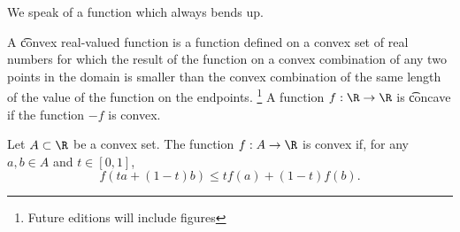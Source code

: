 

We speak of a function which always bends up.


A \t{convex} real-valued function is a function defined on a convex set of real numbers for which the result of the function on a convex combination of any two points in the domain is smaller than the convex combination of the same length of the value of the function on the endpoints.
  \ifhmode\unskip\fi\footnote{
Future editions will include figures
  }
A function $f: \R \to \R$ is \t{concave} if the function $-f$ is convex.


Let $A \subset \R$ be a convex set.
The function $f: A \to \R$ is convex if, for any $a, b \in A$ and $t \in [0, 1]$,
  \[
f(ta + (1-t)b) \leq tf(a) + (1-t)f(b).
  \]

\blankpage
